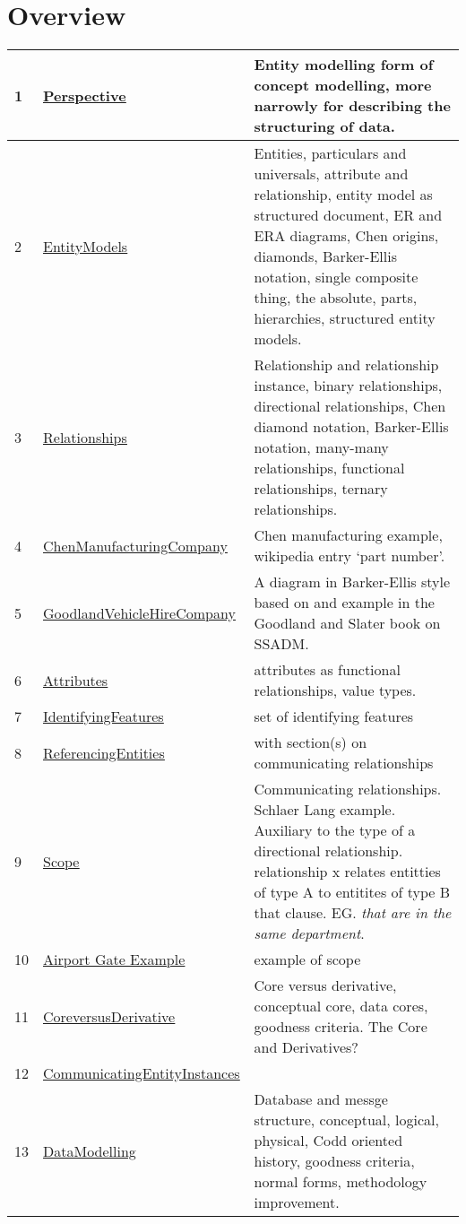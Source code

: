 
\newcommand{\mysection}[1]{\underline{\hyperref[#1]{#1}}}
\section*{Overview}
\begin{tabular}{l l p{7cm}}
1 & \mysection{Perspective} & Entity modelling form of concept modelling, more narrowly for describing the structuring of data.\\
\hline
2 & \mysection{EntityModels} & Entities, particulars and universals, attribute and relationship, entity model as structured document, ER and ERA diagrams, Chen origins, diamonds, Barker-Ellis notation, single composite thing, the absolute, parts, hierarchies, structured entity models.\\
\hline
3 & \mysection{Relationships} & Relationship and relationship instance, binary relationships, directional relationships, Chen diamond notation, Barker-Ellis notation, many-many relationships, functional relationships, ternary relationships. \\
\hline
4 & \mysection{ChenManufacturingCompany} & Chen manufacturing example, wikipedia entry `part number'.\\
\hline
5 & \mysection{GoodlandVehicleHireCompany} & A diagram in Barker-Ellis style based on and example in the Goodland and Slater book on SSADM.\\
\hline
6 & \mysection{Attributes} & attributes as functional relationships, value types.
\\
\hline
7 & \mysection{IdentifyingFeatures} &  set of identifying features\\
\hline
8 & \mysection{ReferencingEntities} &  with section(s) on communicating relationships\\
\hline
9 & \mysection{Scope} & Communicating relationships.   Schlaer Lang example. 
Auxiliary to the type of a directional relationship. 
relationship x relates entitties of type A to entitites of type B that clause.
 EG. \textit{that are in the same department}. \\
\hline
10 & \mysection{Airport Gate Example} &  example of scope\\
\hline
11 & \mysection{CoreversusDerivative} &  Core versus derivative, conceptual core, data cores, goodness criteria. The Core and Derivatives? \\
\hline
12 & \mysection{CommunicatingEntityInstances} & \\
\hline
13 & \mysection{DataModelling}& Database and messge structure, conceptual, logical, physical, Codd oriented history, goodness criteria, normal forms, methodology improvement.\\

\end{tabular}
